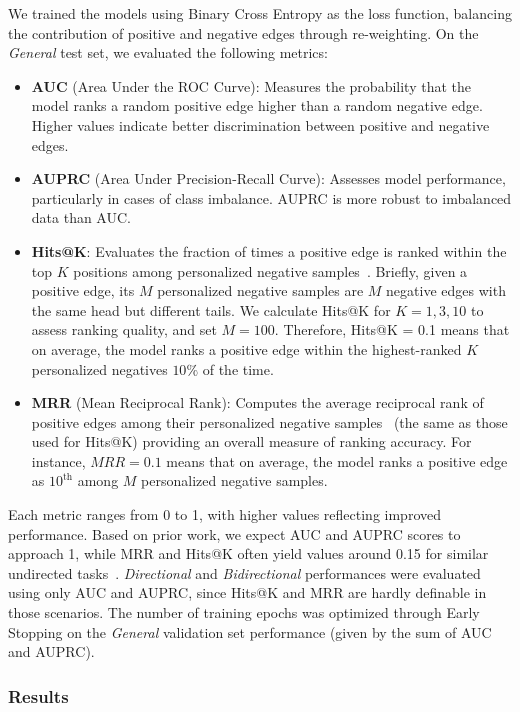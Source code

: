 We trained the models using Binary Cross Entropy as the loss function, balancing the contribution
of positive and negative edges through re-weighting. On the \emph{General} test set, we evaluated
the following metrics:

\begin{itemize}
    \item \textbf{AUC} (Area Under the ROC Curve): Measures the probability that the model ranks a
    random positive edge higher than a random negative edge. Higher values indicate better
    discrimination between positive and negative edges.
    \item \textbf{AUPRC} (Area Under Precision-Recall Curve): Assesses model performance,
    particularly in cases of class imbalance. AUPRC is more robust to imbalanced data than AUC.
    \item \textbf{Hits@K}: Evaluates the fraction of times a positive edge is ranked within the
    top $K$ positions among personalized negative samples~\cite{Li2023}. Briefly, given a positive
    edge, its $M$ personalized negative samples are $M$ negative edges with the same head but
    different tails. We calculate Hits@K for $K = 1, 3, 10$ to assess ranking quality, and
    set $M = 100$. Therefore, Hits@K = 0.1 means that on average, the model ranks a positive
    edge within the highest-ranked $K$ personalized negatives $10\%$ of the time.
    \item \textbf{MRR} (Mean Reciprocal Rank): Computes the average reciprocal rank of positive
    edges among their personalized negative samples~\cite{Li2023} (the same as those used for Hits@K)
    providing an overall measure of ranking accuracy. For instance, $MRR = 0.1$ means that on average,
    the model ranks a positive edge as $10^{\text{th}}$ among $M$ personalized negative samples.
\end{itemize}

Each metric ranges from 0 to 1, with higher values reflecting improved performance.
Based on prior work, we expect AUC and AUPRC scores to approach 1, while MRR and Hits@K often
yield values around 0.15 for similar undirected tasks~\cite{Li2023}. \emph{Directional} and
\emph{Bidirectional} performances were evaluated using only AUC and AUPRC, since Hits@K and MRR
are hardly definable in those scenarios. The number of training epochs was optimized through
Early Stopping on the \emph{General} validation set performance (given by the sum of AUC and AUPRC).

\subsubsection{Results}

